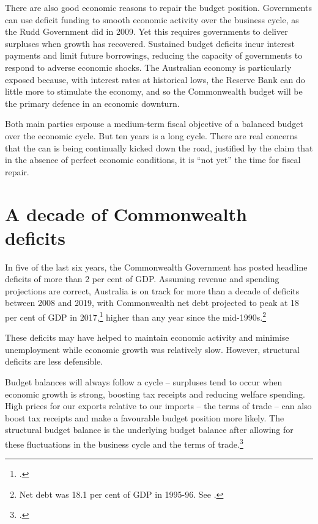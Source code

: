 There are also good economic reasons to repair the budget position. Governments can use deficit funding to smooth economic activity over the business cycle, as the Rudd Government did in 2009. Yet this requires governments to deliver surpluses when growth has recovered. Sustained budget deficits incur interest payments and limit future borrowings, reducing the capacity of governments to respond to adverse economic shocks. The Australian economy is particularly exposed because, with interest rates at historical lows, the Reserve Bank can do little more to stimulate the economy, and so the Commonwealth budget will be the primary defence in an economic downturn. 

Both main parties espouse a medium-term fiscal objective of a balanced budget over the economic cycle. But ten years is a long cycle. There are real concerns that the can is being continually kicked down the road, justified by the claim that in the absence of perfect economic conditions, it is “not yet” the time for fiscal repair.

\chapter{A decade of Commonwealth deficits}\label{chapter:FISCAL-2}
In five of the last six years, the Commonwealth Government has posted headline deficits of more than 2 per cent of GDP\@. Assuming revenue and spending projections are correct, Australia is on track for more than a decade of deficits between 2008 and 2019, with Commonwealth net debt projected to peak at 18 per cent of GDP in 2017,\footcite[][3--9]{Treasury2015BudgetPapers201516}  higher than any year since the mid-1990s.\footnote{Net debt was 18.1 per cent of GDP in 1995-96. See \textcite[][273]{Treasury2014-MYEFO-2014-15}.}

These deficits may have helped to maintain economic activity and minimise unemployment while economic growth was relatively slow. However, structural deficits are less defensible. 

Budget balances will always follow a cycle – surpluses tend to occur when economic growth is strong, boosting tax receipts and reducing welfare spending. High prices for our exports relative to our imports – the terms of trade – can also boost tax receipts and make a favourable budget position more likely. The structural budget balance is the underlying budget balance after allowing for these fluctuations in the business cycle and the terms of trade.\footcite{DaleyWoodWeidmannEtAl2014}  

